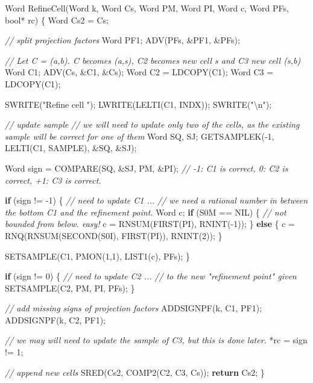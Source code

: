 \documentclass[
]{book}
\newenvironment{Shaded}{\begin{snugshade}}{\end{snugshade}}
\newcommand{\CommentTok}[1]{\textcolor[rgb]{0.56,0.35,0.01}{\textit{#1}}}
\newcommand{\ControlFlowTok}[1]{\textcolor[rgb]{0.13,0.29,0.53}{\textbf{#1}}}
\newcommand{\DataTypeTok}[1]{\textcolor[rgb]{0.13,0.29,0.53}{#1}}
\newcommand{\DecValTok}[1]{\textcolor[rgb]{0.00,0.00,0.81}{#1}}
\newcommand{\NormalTok}[1]{#1}
\newcommand{\SpecialCharTok}[1]{\textcolor[rgb]{0.00,0.00,0.00}{#1}}
\newcommand{\StringTok}[1]{\textcolor[rgb]{0.31,0.60,0.02}{#1}}
\theoremstyle{definition}
\theoremstyle{definition}
\theoremstyle{definition}
\theoremstyle{definition}
\theoremstyle{remark}
\begin{document}
\begin{Shaded}
\begin{Highlighting}[numbers=left,,]
\NormalTok{Word RefineCell(Word k, Word Cs, Word PM, Word PI, Word c, Word PFs, }\DataTypeTok{bool}\NormalTok{* rc)}
\NormalTok{\{}
\NormalTok{    Word Cs2 = Cs;}

    \CommentTok{// split projection factors}
\NormalTok{    Word PF1;}
\NormalTok{    ADV(PFs, \&PF1, \&PFs);}

    \CommentTok{// Let C = (a,b). C becomes (a,s), C2 becomes new cell s and C3 new cell (s,b)}
\NormalTok{    Word C1;}
\NormalTok{    ADV(Cs, \&C1, \&Cs);}
\NormalTok{    Word C2 = LDCOPY(C1);}
\NormalTok{    Word C3 = LDCOPY(C1);}

\NormalTok{    SWRITE(}\StringTok{"Refine cell "}\NormalTok{); LWRITE(LELTI(C1, INDX)); SWRITE(}\StringTok{"}\SpecialCharTok{\textbackslash{}n}\StringTok{"}\NormalTok{);}

    \CommentTok{// update sample}
    \CommentTok{// we will need to update only two of the cells, as the existing sample will be correct for one of them}
\NormalTok{    Word SQ, SJ;}
\NormalTok{    GETSAMPLEK({-}}\DecValTok{1}\NormalTok{, LELTI(C1, SAMPLE), \&SQ, \&SJ);}

\NormalTok{    Word sign = COMPARE(SQ, \&SJ, PM, \&PI);}
    \CommentTok{// {-}1: C1 is correct, 0: C2 is correct, +1: C3 is correct.}

    \ControlFlowTok{if}\NormalTok{ (sign != {-}}\DecValTok{1}\NormalTok{) \{ }\CommentTok{// need to update C1 ...}
        \CommentTok{// we need a rational number in between the bottom C1 and the refinement point.}
\NormalTok{        Word c;}
        \ControlFlowTok{if}\NormalTok{ (S0M == NIL) \{ }\CommentTok{// not bounded from below. easy!}
\NormalTok{            c = RNSUM(FIRST(PI), RNINT({-}}\DecValTok{1}\NormalTok{));}
\NormalTok{        \} }\ControlFlowTok{else}\NormalTok{ \{}
\NormalTok{            c = RNQ(RNSUM(SECOND(S0I), FIRST(PI)), RNINT(}\DecValTok{2}\NormalTok{));}
\NormalTok{        \}}

\NormalTok{        SETSAMPLE(C1, PMON(}\DecValTok{1}\NormalTok{,}\DecValTok{1}\NormalTok{), LIST1(c), PFs);}
\NormalTok{    \}}

    \ControlFlowTok{if}\NormalTok{ (sign != }\DecValTok{0}\NormalTok{) \{ }\CommentTok{// need to update C2 ...}
        \CommentTok{// to the new "refinement point" given}
\NormalTok{        SETSAMPLE(C2, PM, PI, PFs);}
\NormalTok{    \}}

    \CommentTok{// add missing signs of projection factors}
\NormalTok{    ADDSIGNPF(k, C1, PF1);}
\NormalTok{    ADDSIGNPF(k, C2, PF1);}

    \CommentTok{// we may will need to update the sample of C3, but this is done later.}
\NormalTok{    *rc = sign != }\DecValTok{1}\NormalTok{;}

    \CommentTok{// append new cells}
\NormalTok{    SRED(Cs2, COMP2(C2, C3, Cs));}
    \ControlFlowTok{return}\NormalTok{ Cs2;}
\NormalTok{\}}
\end{Highlighting}
\end{Shaded}
\end{document}
